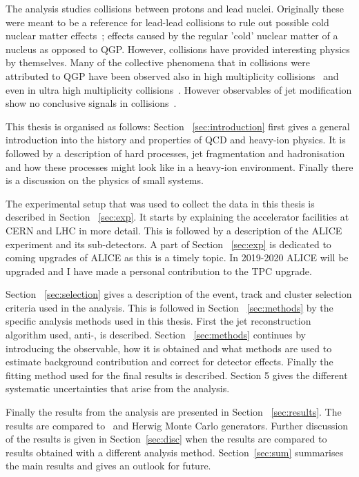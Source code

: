 The analysis studies collisions between protons and lead nuclei. Originally these were meant to be a reference for lead-lead collisions to rule out possible cold nuclear matter effects~\cite{Connors:2017ptx}; effects caused by the regular 'cold' nuclear matter of a nucleus as opposed to QGP. However, \pPb collisions have provided interesting physics by themselves. Many of the collective phenomena that in \PbPb collisions were attributed to QGP have been observed also in high multiplicity \pPb collisions~\cite{Nagle:2018nvi} and even in ultra high multiplicity \pp collisions~\cite{Nagle:2018nvi}. However observables of jet modification show no conclusive signals in \pPb collisions~\cite{Connors:2017ptx,Nagle:2018nvi}. %

This thesis is organised as follows: Section ~\ref{sec:introduction} first gives a general introduction into the history and properties of QCD and heavy-ion physics. It is followed by a description of hard processes, jet fragmentation and hadronisation and how these processes might look like in a heavy-ion environment. Finally there is a discussion on the physics of small systems.

The experimental setup that was used to collect the data in this thesis is described in Section ~\ref{sec:exp}. It starts by explaining the accelerator facilities at CERN and LHC in more detail. This is followed by a description of the ALICE experiment and its sub-detectors. A part of Section ~\ref{sec:exp} is dedicated to coming upgrades of ALICE as this is a timely topic. In 2019-2020 ALICE will be upgraded and I have made a personal contribution to the TPC upgrade.

Section ~\ref{sec:selection} gives a description of the event, track and cluster selection criteria used in the analysis. This is followed in Section ~\ref{sec:methods} by the specific analysis methods used in this thesis. First the jet reconstruction algorithm used, anti-\kt{}, is described. Section ~\ref{sec:methods} continues by introducing the \jt{} observable, how it is obtained and what methods are used to estimate background contribution and correct for detector effects. Finally the fitting method used for the final results is described. Section 5 gives the different systematic uncertainties that arise from the analysis.

Finally the results from the analysis are presented in Section ~\ref{sec:results}. The results are compared to \pythia~and Herwig Monte Carlo generators. Further discussion of the results is given in Section~\ref{sec:disc} when the results are compared to \jt{} results obtained with a different analysis method. Section~\ref{sec:sum} summarises the main results and gives an outlook for future.


